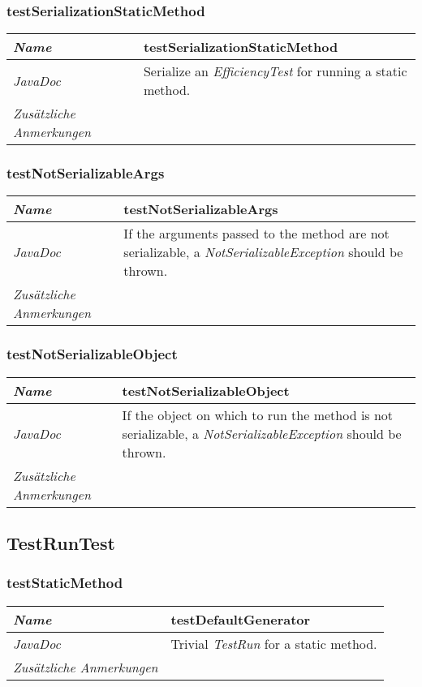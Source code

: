 \documentclass[a4paper]{report}
\begin{document}
\subsubsection{testSerializationStaticMethod}
\begin{tabular}{p{2.3cm}  p{11.5cm}}
  \hline
 \textit{Name} & testSerializationStaticMethod\\
  \hline
 \textit{JavaDoc} & Serialize an \emph{EfficiencyTest} for running a static method. \\
  \hline
 \textit{Zusätzliche Anmerkungen} & \\
  \hline
\end{tabular}

\subsubsection{testNotSerializableArgs}
\begin{tabular}{p{2.3cm}  p{11.5cm}}
  \hline
 \textit{Name} & testNotSerializableArgs\\
  \hline
 \textit{JavaDoc} & If the arguments passed to the method are not serializable, a \emph{NotSerializableException} should be thrown. \\
  \hline
 \textit{Zusätzliche Anmerkungen} & \\
  \hline
\end{tabular}

\subsubsection{testNotSerializableObject}
\begin{tabular}{p{2.3cm}  p{11.5cm}}
  \hline
 \textit{Name} & testNotSerializableObject\\
  \hline
 \textit{JavaDoc} & If the object on which to run the method is not serializable, a \emph{NotSerializableException} should be thrown. \\
  \hline
 \textit{Zusätzliche Anmerkungen} & \\
  \hline
\end{tabular}

\subsection{TestRunTest}

\subsubsection{testStaticMethod}
\begin{tabular}{p{2.3cm}  p{11.5cm}}
  \hline
 \textit{Name} & testDefaultGenerator\\
  \hline
 \textit{JavaDoc} & Trivial \emph{TestRun} for a static method. \\
  \hline
 \textit{Zusätzliche Anmerkungen} & \\
 \hline
\end{tabular}
\end{document}
